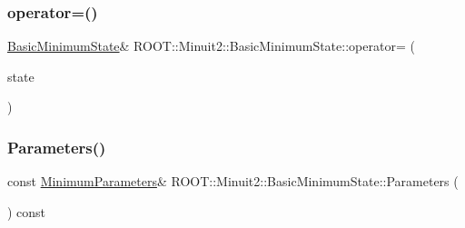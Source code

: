 \mbox{\label{classROOT_1_1Minuit2_1_1BasicMinimumState_a68cf1c28f5f728fa62a0c39ff943a2bf}} 
\subsubsection{\texorpdfstring{operator=()}{operator=()}\hspace{0.1cm}{\footnotesize\ttfamily [2/2]}}
{\footnotesize\ttfamily \mbox{\hyperlink{classROOT_1_1Minuit2_1_1BasicMinimumState}{Basic\+Minimum\+State}}\& R\+O\+O\+T\+::\+Minuit2\+::\+Basic\+Minimum\+State\+::operator= (\begin{DoxyParamCaption}\item[{const \mbox{\hyperlink{classROOT_1_1Minuit2_1_1BasicMinimumState}{Basic\+Minimum\+State}} \&}]{state }\end{DoxyParamCaption})\hspace{0.3cm}{\ttfamily [inline]}}

\mbox{\label{classROOT_1_1Minuit2_1_1BasicMinimumState_a0b72fce84557374c989a6581711e6e6a}} 
\subsubsection{\texorpdfstring{Parameters()}{Parameters()}\hspace{0.1cm}{\footnotesize\ttfamily [1/2]}}
{\footnotesize\ttfamily const \mbox{\hyperlink{classROOT_1_1Minuit2_1_1MinimumParameters}{Minimum\+Parameters}}\& R\+O\+O\+T\+::\+Minuit2\+::\+Basic\+Minimum\+State\+::\+Parameters (\begin{DoxyParamCaption}{ }\end{DoxyParamCaption}) const\hspace{0.3cm}{\ttfamily [inline]}}

